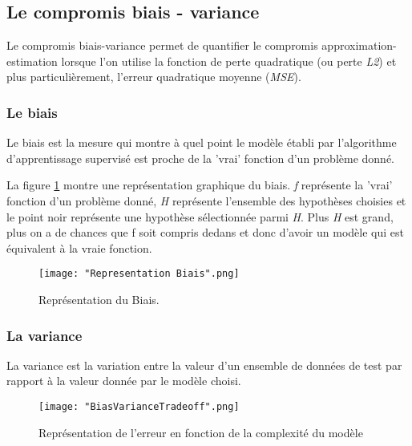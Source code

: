 \documentclass[a4paper]{article}
\begin{document}
\newpage

\subsection{Le compromis biais - variance}

Le compromis biais-variance permet de quantifier le compromis approximation-estimation lorsque l'on utilise la fonction de perte quadratique (ou perte \textit{L2}) et plus particulièrement, l'erreur quadratique moyenne (\textit{MSE}).

\subsubsection{Le biais}
Le biais est la mesure qui montre à quel point le modèle établi par l'algorithme d'apprentissage supervisé est proche de la 'vrai' fonction d'un problème donné. \newline

La figure \ref{BiasRepresentation} montre une représentation graphique du biais. \textit{f} représente la 'vrai' fonction d'un problème donné, \textit{H} représente l'ensemble des hypothèses choisies et le point noir représente une hypothèse sélectionnée parmi \textit{H}. Plus \textit{H} est grand, plus on a de chances que f soit compris dedans et donc d'avoir un modèle qui est équivalent à la vraie fonction. \newline

\begin{figure}[!h]
	\centering
	\texttt{[image: "Representation Biais".png]}
	\caption{Représentation du Biais.}
	\cite{BiasVarianceTradeoffTextbooksUpdate}
	\label{BiasRepresentation}
\end{figure}

\subsubsection{La variance}

La variance est la variation entre la valeur d'un ensemble de données de test par rapport à la valeur donnée par le modèle choisi. 

\newpage

\begin{figure}[!h]
	\centering
	\texttt{[image: "BiasVarianceTradeoff".png]}
	\caption{Représentation de l'erreur en fonction de la complexité du modèle}
	\cite{BiasVarianceTradeoffTextbooksUpdate}
	\label{TradeoffRepresentation}
\end{figure}
\end{document}

